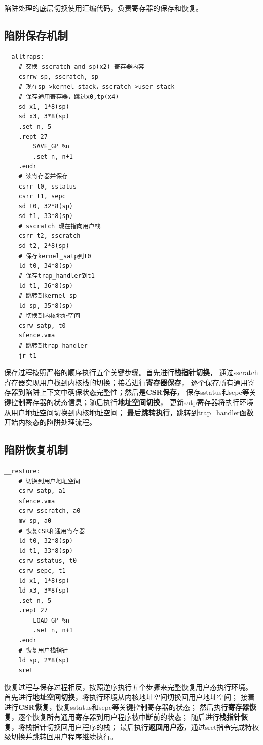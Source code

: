 陷阱处理的底层切换使用汇编代码，负责寄存器的保存和恢复。

\subsection{陷阱保存机制}

\begin{lstlisting}[language={[x86masm]Assembler},caption={陷阱上下文保存}, label={lst:alltraps}]
__alltraps:
    # 交换 sscratch and sp(x2) 寄存器内容
    csrrw sp, sscratch, sp
    # 现在sp->kernel stack，sscratch->user stack
    # 保存通用寄存器，跳过x0,tp(x4)
    sd x1, 1*8(sp)
    sd x3, 3*8(sp)
    .set n, 5
    .rept 27
        SAVE_GP %n
        .set n, n+1
    .endr
    # 读寄存器并保存
    csrr t0, sstatus
    csrr t1, sepc
    sd t0, 32*8(sp)
    sd t1, 33*8(sp)
    # sscratch 现在指向用户栈
    csrr t2, sscratch
    sd t2, 2*8(sp)
    # 保存kernel_satp到t0
    ld t0, 34*8(sp)
    # 保存trap_handler到t1
    ld t1, 36*8(sp)
    # 跳转到kernel_sp
    ld sp, 35*8(sp)
    # 切换到内核地址空间
    csrw satp, t0
    sfence.vma
    # 跳转到trap_handler
    jr t1
\end{lstlisting}

保存过程按照严格的顺序执行五个关键步骤。首先进行\textbf{栈指针切换}，
通过sscratch寄存器实现用户栈到内核栈的切换；接着进行\textbf{寄存器保存}，
逐个保存所有通用寄存器到陷阱上下文中确保状态完整性；然后是\textbf{CSR保存}，
保存sstatus和sepc等关键控制寄存器的状态信息；随后执行\textbf{地址空间切换}，
更新satp寄存器将执行环境从用户地址空间切换到内核地址空间；
最后\textbf{跳转执行}，跳转到trap\_handler函数开始内核态的陷阱处理流程。

\subsection{陷阱恢复机制}

\begin{lstlisting}[language={[x86masm]Assembler},caption={陷阱上下文恢复}, label={lst:restore}]
__restore:
    # 切换到用户地址空间
    csrw satp, a1
    sfence.vma
    csrw sscratch, a0
    mv sp, a0
    # 恢复CSR和通用寄存器
    ld t0, 32*8(sp)
    ld t1, 33*8(sp)
    csrw sstatus, t0
    csrw sepc, t1
    ld x1, 1*8(sp)
    ld x3, 3*8(sp)
    .set n, 5
    .rept 27
        LOAD_GP %n
        .set n, n+1
    .endr
    # 恢复用户栈指针
    ld sp, 2*8(sp)
    sret
\end{lstlisting}

恢复过程与保存过程相反，按照逆序执行五个步骤来完整恢复用户态执行环境。
首先进行\textbf{地址空间切换}，将执行环境从内核地址空间切换回用户地址空间；
接着进行\textbf{CSR恢复}，恢复sstatus和sepc等关键控制寄存器的状态；
然后执行\textbf{寄存器恢复}，逐个恢复所有通用寄存器到用户程序被中断前的状态；
随后进行\textbf{栈指针恢复}，将栈指针切换回用户程序的栈；
最后执行\textbf{返回用户态}，通过sret指令完成特权级切换并跳转回用户程序继续执行。

